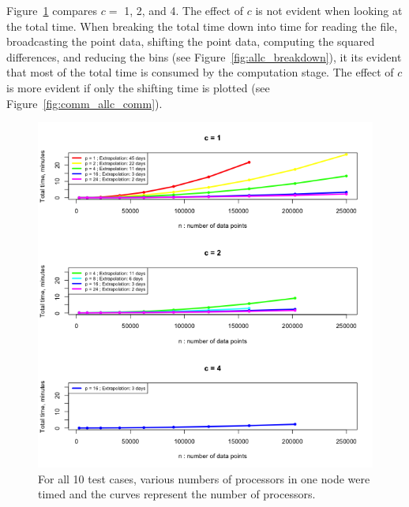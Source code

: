 Figure~\ref{fig:comm_allc_timings} compares $c=$ 1, 2, and 4. The effect of $c$ is not evident when looking at the total time. When breaking the total time down into time for reading the file, broadcasting the point data, shifting the point data, computing the squared differences, and reducing the bins (see Figure~\ref{fig:allc_breakdown}), it its evident that most of the total time is consumed by the computation stage. The effect of $c$ is more evident if only the shifting time is plotted (see Figure~\ref{fig:comm_allc_comm}).

\begin{figure}[!h]
   \centering
   \includegraphics[width=\textwidth]{./fig/comm_allc_timings.png} %
   \caption{For all 10 test cases, various numbers of processors in one node were timed and the curves represent the number of processors.}
   \label{fig:comm_allc_timings}
\end{figure}

